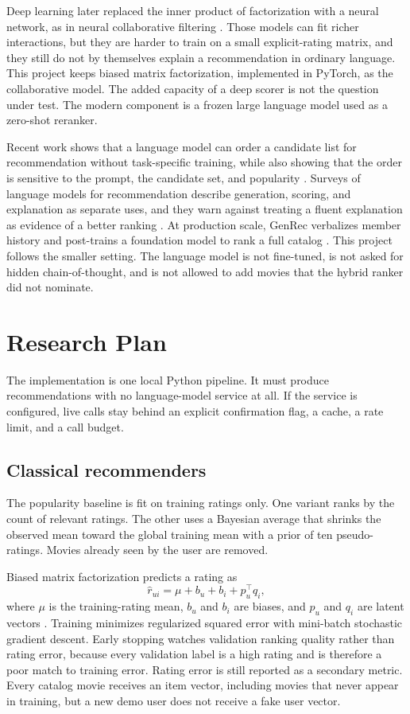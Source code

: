 \documentclass[conference]{IEEEtran}
\begin{document}
Deep learning later replaced the inner product of factorization with a neural network, as in neural collaborative filtering \cite{he2017}. Those models can fit richer interactions, but they are harder to train on a small explicit-rating matrix, and they still do not by themselves explain a recommendation in ordinary language. This project keeps biased matrix factorization, implemented in PyTorch, as the collaborative model. The added capacity of a deep scorer is not the question under test. The modern component is a frozen large language model used as a zero-shot reranker.

Recent work shows that a language model can order a candidate list for recommendation without task-specific training, while also showing that the order is sensitive to the prompt, the candidate set, and popularity \cite{hou2024,dai2023}. Surveys of language models for recommendation describe generation, scoring, and explanation as separate uses, and they warn against treating a fluent explanation as evidence of a better ranking \cite{wu2024}. At production scale, GenRec verbalizes member history and post-trains a foundation model to rank a full catalog \cite{li2026}. This project follows the smaller setting. The language model is not fine-tuned, is not asked for hidden chain-of-thought, and is not allowed to add movies that the hybrid ranker did not nominate.

\section{Research Plan}
The implementation is one local Python pipeline. It must produce recommendations with no language-model service at all. If the service is configured, live calls stay behind an explicit confirmation flag, a cache, a rate limit, and a call budget.

\subsection{Classical recommenders}
The popularity baseline is fit on training ratings only. One variant ranks by the count of relevant ratings. The other uses a Bayesian average that shrinks the observed mean toward the global training mean with a prior of ten pseudo-ratings. Movies already seen by the user are removed.

Biased matrix factorization predicts a rating as
\begin{equation}
\hat{r}_{ui}=\mu+b_u+b_i+p_u^{\top}q_i,
\end{equation}
where \(\mu\) is the training-rating mean, \(b_u\) and \(b_i\) are biases, and \(p_u\) and \(q_i\) are latent vectors \cite{koren2009}. Training minimizes regularized squared error with mini-batch stochastic gradient descent. Early stopping watches validation ranking quality rather than rating error, because every validation label is a high rating and is therefore a poor match to training error. Rating error is still reported as a secondary metric. Every catalog movie receives an item vector, including movies that never appear in training, but a new demo user does not receive a fake user vector.
\end{document}

